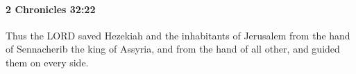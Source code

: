 
		\paragraph{2 Chronicles 32:22} %
			\label{2CHRONICLES-32-22}

			Thus the LORD saved Hezekiah and the inhabitants of Jerusalem from the hand of Sennacherib the king of Assyria, and from the hand of all other, and guided them on every side.


